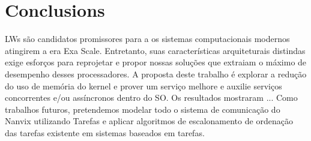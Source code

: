 \section{Conclusions}
\label{sec:conclusions}

	LWs são candidatos promissores para a os sistemas computacionais modernos
	atingirem a era Exa Scale. Entretanto, suas características arquiteturais
	distindas exige esforços para reprojetar e propor nossas soluções que
	extraiam o máximo de desempenho desses processadores.
	A proposta deste trabalho é explorar a redução do uso de memória do kernel
	e prover um serviço melhore e auxilie serviços concorrentes e/ou assíncronos 
	dentro do SO.
	Os resultados mostraram ...
	Como trabalhos futuros, pretendemos modelar todo o sistema de comunicação
	do Nanvix utilizando Tarefas e aplicar algoritmos de escalonamento de
	ordenação das tarefas existente em sistemas baseados em tarefas.


